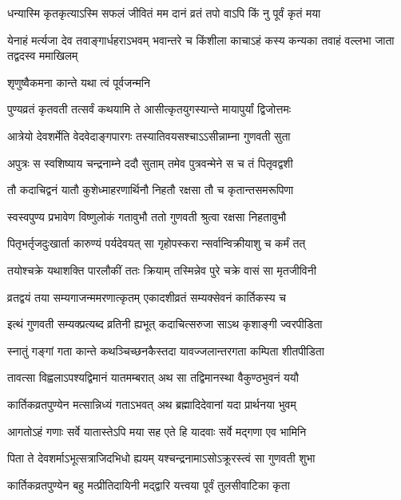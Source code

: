 \twolineshloka
{धन्यास्मि कृतकृत्याऽस्मि सफलं जीवितं मम}
{दानं व्रतं तपो वाऽपि किं नु पूर्वं कृतं मया} %

\threelineshloka
{येनाहं मर्त्यजा देव तवाङ्गार्धहराऽभवम्}
{भवान्तरे च किंशीला काचाऽहं कस्य कन्यका}
{तवाहं वल्लभा जाता तद्वदस्व ममाखिलम्} %



\onelineshloka
{शृणुष्वैकमना कान्ते यथा त्वं पूर्वजन्मनि} %

\twolineshloka
{पुण्यव्रतं कृतवती तत्सर्वं कथयामि ते}
{आसीत्कृतयुगस्यान्ते मायापुर्यां द्विजोत्तमः} %

\twolineshloka
{आत्रेयो देवशर्मेति वेदवेदाङ्गपारगः}
{तस्यातिवयसश्चाऽऽसीन्नाम्ना गुणवती सुता} %

\twolineshloka
{अपुत्रः स स्वशिष्याय चन्द्रनाम्ने ददौ सुताम्}
{तमेव पुत्रवन्मेने स च तं पितृवद्वशी} %

\twolineshloka
{तौ कदाचिद्वनं यातौ कुशेध्माहरणार्थिनौ}
{निहतौ रक्षसा तौ च कृतान्तसमरूपिणा} %

\twolineshloka
{स्वस्वपुण्य प्रभावेण विष्णुलोकं गतावुभौ}
{ततो गुणवती श्रुत्वा रक्षसा निहतावुभौ} %

\twolineshloka
{पितृभर्तृजदुःखार्ता कारुण्यं पर्यदेवयत्}
{सा गृहोपस्करा न्सर्वान्विक्रीयाशु च कर्मं तत्} %

\twolineshloka
{तयोश्चक्रे यथाशक्ति पारलौकीं ततः क्रियाम्}
{तस्मिन्नेव पुरे चक्रे वासं सा मृतजीविनी} %

\twolineshloka
{व्रतद्वयं तया सम्यगाजन्ममरणात्कृतम्}
{एकादशीव्रतं सम्यक्सेवनं कार्तिकस्य च} %

\twolineshloka
{इत्थं गुणवती सम्यक्प्रत्यब्द व्रतिनी ह्यभूत्}
{कदाचित्सरुजा साऽथ कृशाङ्गी ज्वरपीडिता} %

\twolineshloka
{स्नातुं गङ्गां गता कान्ते कथञ्चिच्छनकैस्तदा}
{यावज्जलान्तरगता कम्पिता शीतपीडिता} %

\twolineshloka
{तावत्सा विह्वलाऽपश्यद्विमानं यातमम्बरात्}
{अथ सा तद्विमानस्था वैकुण्ठभुवनं ययौ} %

\twolineshloka
{कार्तिकव्रतपुण्येन मत्सान्निध्यं गताऽभवत्}
{अथ ब्रह्मादिदेवानां यदा प्रार्थनया भुवम्} %

\twolineshloka
{आगतोऽहं गणाः सर्वे यातास्तेऽपि मया सह}
{एते हि यादवाः सर्वे मद्गणा एव भामिनि} %

\twolineshloka
{पिता ते देवशर्माऽभूत्सत्राजिदभिधो ह्ययम्}
{यश्चन्द्रनामाऽसोऽक्रूरस्त्वं सा गुणवती शुभा} %

\twolineshloka
{कार्तिकव्रतपुण्येन बहु मत्प्रीतिदायिनी}
{मद्द्वारि यत्त्वया पूर्वं तुलसीवाटिका कृता} %

